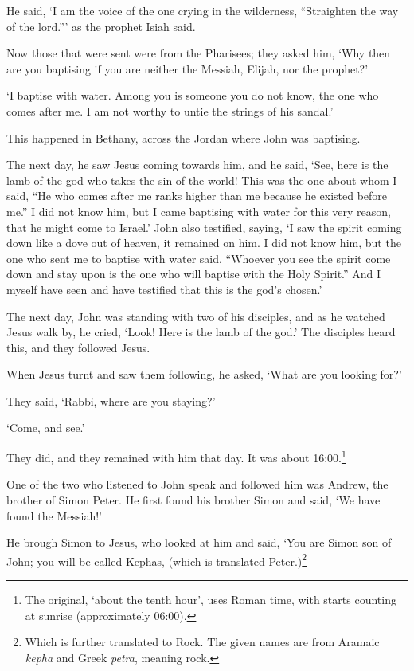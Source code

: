 He said, 
`I am the voice of the one crying in the wilderness,
``Straighten the way of the lord.'''
as the prophet Isiah said.

Now those that were sent were from the Pharisees;
they asked him, 
`Why then are you baptising 
if you are neither the Messiah, Elijah, nor the prophet?'

`I baptise with water.  Among you is someone you do not know,
the one who comes after me.  
I am not worthy to untie the strings of his sandal.'

This happened in Bethany, across the Jordan where John was baptising.

The next day, he saw Jesus coming towards him, and he said,
`See, here is the lamb of the god who takes the sin of the world!
This was the one about whom I said,
``He who comes after me ranks higher than me
because he existed before me.''
I did not know him, but I came baptising with water for this very reason,
that he might come to Israel.'
John also testified, saying, 
`I saw the spirit coming down like a dove out of heaven,
it remained on him.
I did not know him, 
but the one who sent me to baptise with water said,
``Whoever you see the spirit come down and stay upon 
is the one who will baptise with the Holy Spirit.''
And I myself have seen and have testified that this is the god's chosen.'

The next day,
John was standing with two of his disciples,
and as he watched Jesus walk by, he cried, 
`Look! Here is the lamb of the god.'
The disciples heard this, and they followed Jesus. 

When Jesus turnt and saw them following, he asked,
`What are you looking for?'

They said, `Rabbi, where are you staying?'

`Come, and see.'

They did, and they remained with him that day. 
It was about 16:00.\footnote{The original, `about the tenth hour',
uses Roman time, with starts counting at sunrise (approximately 06:00).
}

One of the two who listened to John speak and followed him was Andrew,
the brother of Simon Peter.
He first found his brother Simon and said,
`We have found the Messiah!'

He brough Simon to Jesus,
who looked at him and said,
`You are Simon son of John; 
you will be called Kephas,
(which is translated Peter.)\footnote{
    Which is further translated to Rock. 
    The given names are from Aramaic \textit{kepha}
    and Greek \textit{petra}, meaning rock.
}

